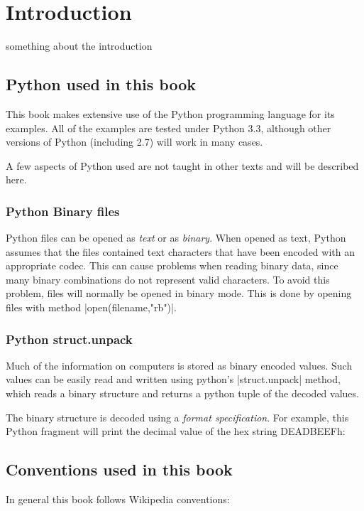\chapter{Introduction}
something about the introduction
\section{Python used in this book}
This book makes extensive use of the Python programming language for
its examples. All of the examples are tested under Python 3.3,
although other versions of Python (including 2.7) will work in many
cases. 

A few aspects of Python used are not taught in other texts and will be
described here.

\subsection{Python Binary files}
Python files can be opened as \emph{text} or as \emph{binary}. When
opened as text, Python assumes that the files contained text
characters that have been encoded with an appropriate codec. This can
cause problems when reading binary data, since many binary
combinations do not represent valid characters. To avoid this problem,
files will normally be opened in binary mode. This is done by opening
files with method |open(filename,"rb")|.

\subsection{Python struct.unpack}
Much of the information on computers is stored as binary encoded
values. Such values can be easily read and written using python's
|struct.unpack| method, which reads a binary structure and returns a
python tuple of the decoded values.  

The binary structure is decoded using a \emph{format
  specification}. For example, this Python fragment will print the
decimal value of the hex string DEADBEEFh:







\section{Conventions used in this book}
In general this book follows Wikipedia conventions:


